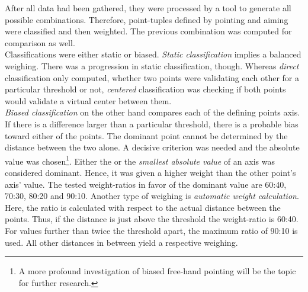 After all data had been gathered, they were processed by a tool to generate all possible combinations. Therefore, point-tuples defined by pointing and aiming were classified and then weighted. The previous combination was computed for comparison as well.
\\
Classifications were either static or biased. \textit{Static classification} implies a balanced weighing. There was a progression in static classification, though. Whereas \textit{direct} classification only computed, whether two points were validating each other for a particular threshold or not, \textit{centered} classification was checking if both points would validate a virtual center between them.
\\
\textit{Biased classification} on the other hand compares each of the defining points axis. If there is a difference larger than a particular threshold, there is a probable bias toward either of the points. The dominant point cannot be determined by the distance between the two alone. A decisive criterion was needed and the absolute value was chosen\footnote{A more profound investigation of biased free-hand pointing will be the topic for further research.}. Either the  or the \textit{smallest absolute value} of an axis was considered dominant. Hence, it was given a higher weight than the other point's axis' value. The tested weight-ratios in favor of the dominant value are 60:40, 70:30, 80:20 and 90:10. Another type of weighing is \textit{automatic weight calculation}. Here, the ratio is calculated with respect to the actual distance between the points. Thus, if the distance is just above the threshold the weight-ratio is 60:40. For values further than twice the threshold apart, the maximum ratio of 90:10 is used. All other distances in between yield a respective weighing.

